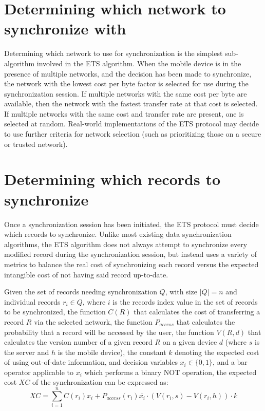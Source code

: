 \section{Determining which network to synchronize with}

Determining which network to use for synchronization is the simplest sub-algorithm involved in the ETS algorithm.  When the mobile device is in the presence of multiple networks, and the decision has been made to synchronize, the network with the lowest cost per byte factor is selected for use during the synchronization session.  If multiple networks with the same cost per byte are available, then the network with the fastest transfer rate at that cost is selected.  If multiple networks with the same cost and transfer rate are present, one is selected at random.  Real-world implementations of the ETS protocol may decide to use further criteria for network selection (such as prioritizing those on a secure or trusted network).

\section{Determining which records to synchronize}\label{selecting_records}

Once a synchronization session has been initiated, the ETS protocol must decide which records to synchronize.  Unlike most existing data synchronization algorithms, the ETS algorithm does not always attempt to synchronize every modified record during the synchronization session, but instead uses a  variety of metrics to balance the real cost of synchronizing each record versus the expected intangible cost of not having said record up-to-date.

Given the set of records needing synchronization $Q$, with size $|Q| = n$ and individual records $r_i \in Q$, where $i$ is the records index value in the set of records to be synchronized, the function $C(R)$ that calculates the cost of transferring a record $R$ via the selected network, the function $P_{access}$ that calculates the probability that a record will be accessed by the user, the function $V(R, d)$ that calculates the version number of a given record $R$ on a given device $d$ (where $s$ is the server and $h$ is the mobile device), the constant $k$ denoting the expected cost of using out-of-date information, and decision variables $x_i \in \{0, 1\}$, and a bar operator applicable to $x_i$ which performs a binary NOT operation, the expected cost $XC$ of the synchronization can be expressed as:
\begin{equation}
XC = \sum_{i=1}^n C(r_i)x_i+P_{access}(r_i)\overline{x_i}\cdot(V(r_{i}, s)-V(r_{i}, h))\cdot k \label{expected_sync_cost}
\end{equation}

